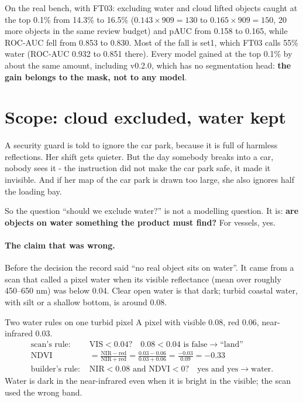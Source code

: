 On the real bench, with FT03\hfil{}\hfilneg{}: excluding water and cloud lifted objects caught at the top
0.1\% from 14.3\% to 16.5\% ($0.143 \times 909 = 130$ to $0.165 \times 909 = 150$, 20 more objects in the same review
budget) and pAUC from 0.158 to 0.165, while ROC-AUC fell from 0.853 to 0.830. Most of the fall is set1, which FT03
calls 55\% water (ROC-AUC 0.932 to 0.851 there). Every model gained at the top 0.1\% by about the same amount, including
v0.2.0, which has no segmentation head: \textbf{the gain belongs to the mask, not to any model}.

\section{Scope: cloud excluded, water kept}\label{sec:runeval:scope}

\begin{analogy}
A security guard is told to ignore the car park, because it is full of harmless reflections. Her shift gets quieter. But
the day somebody breaks into a car, nobody sees it - the instruction did not make the car park safe, it made it
invisible. And if her map of the car park is drawn too large, she also ignores half the loading bay.
\end{analogy}

So the question ``should we exclude water?'' is not a modelling question. It is: \textbf{are objects on water something
the product must find?} For vessels, yes.

\paragraph{The claim that was wrong.} Before the decision the record said ``no real object sits on water''. It came
from a scan that called a pixel water when its visible reflectance (mean over roughly 450--650 nm) was below 0.04.
Clear open water is that dark; turbid coastal water, with silt or a shallow bottom, is around 0.08.

\begin{worked}[label={we:runeval:water}]{Two water rules on one turbid pixel}
A pixel with visible 0.08, red 0.06, near-infrared 0.03\tagA{}.
\begin{align*}
\text{scan's rule: } & \mathrm{VIS} < 0.04? \quad 0.08 < 0.04 \text{ is false} \to \text{``land''}\\
\mathrm{NDVI} &= \frac{\mathrm{NIR} - \mathrm{red}}{\mathrm{NIR} + \mathrm{red}} = \frac{0.03 - 0.06}{0.03 + 0.06}
  = \frac{-0.03}{0.09} = -0.33\\
\text{builder's rule: } & \mathrm{NIR} < 0.08 \text{ and } \mathrm{NDVI} < 0? \quad \text{yes and yes} \to \text{water.}
\end{align*}
Water is dark in the near-infrared even when it is bright in the visible; the scan used the wrong band.
\end{worked}

